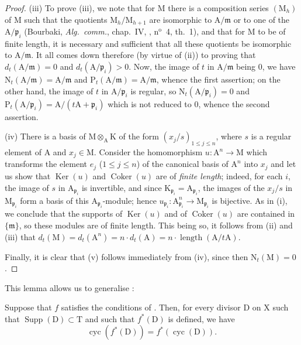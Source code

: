 \begin{proof}
(iii) To prove (iii), we note that for $\mathrm{M}$ there is a composition series $(\mathrm{M}_h)$ of $\mathrm{M}$ such that the quotients $\mathrm{M}_h/\mathrm{M}_{h+1}$ are isomorphic to $\mathrm{A}/\mathfrak{m}$ or to one of the $\mathrm{A}/\mathfrak{p}_i$ (Bourbaki, \emph{Alg.\ comm.}, chap.~IV, , n$^{\mathrm{o}}$~4, th.~1), and that for $\mathrm{M}$ to be of finite length, it is necessary and sufficient that all these quotients be isomorphic to $\mathrm{A}/\mathfrak{m}$.
It all comes down therefore (by virtue of (ii)) to proving that $d_t(\mathrm{A}/\mathfrak{m})=0$ and $d_t(\mathrm{A}/\mathfrak{p}_i)>0$.
Now, the image of $t$ in $\mathrm{A}/\mathfrak{m}$ being $0$, we have $\mathrm{N}_t(\mathrm{A}/\mathfrak{m})=\mathrm{A}/\mathfrak{m}$ and $\mathrm{P}_t(\mathrm{A}/\mathfrak{m})=\mathrm{A}/\mathfrak{m}$, whence the first assertion; on the other hand, the image of $t$ in $\mathrm{A}/\mathfrak{p}_i$ is regular, so $\mathrm{N}_t(\mathrm{A}/\mathfrak{p}_i)=0$ and $\mathrm{P}_t(\mathrm{A}/\mathfrak{p}_i)=\mathrm{A}/(t\mathrm{A}+\mathfrak{p}_i)$ which is not reduced to $0$, whence the second assertion.

(iv) There is a basis of $\mathrm{M}\otimes_{\mathrm{A}}\mathrm{K}$ of the form $(x_j/s)_{1\leq j\leq n}$, where $s$ is a regular element of $\mathrm{A}$ and $x_j\in\mathrm{M}$.
Consider the homomorphism $u:\mathrm{A}^n\to\mathrm{M}$ which transforms the element $e_j$ ($1\leq j\leq n$) of the canonical basis of $\mathrm{A}^n$ into $x_j$ and let us show that $\operatorname{Ker}(u)$ and $\operatorname{Coker}(u)$ are of \emph{finite length}; indeed, for each $i$, the image of $s$ in $\mathrm{A}_{\mathfrak{p}_i}$ is invertible, and since $\mathrm{K}_{\mathfrak{p}_i}=\mathrm{A}_{\mathfrak{p}_i}$, the images of the $x_j/s$ in $\mathrm{M}_{\mathfrak{p}_i}$ form a basis of this $\mathrm{A}_{\mathfrak{p}_i}$-module; hence $u_{\mathfrak{p}_i}:\mathrm{A}_{\mathfrak{p}_i}^n\to\mathrm{M}_{\mathfrak{p}_i}$ is bijective.
As in (i), we conclude that the supports of $\operatorname{Ker}(u)$ and of $\operatorname{Coker}(u)$ are contained in $\{\mathfrak{m}\}$, so these modules are of finite length.
This being so, it follows from (ii) and (iii) that $d_t(\mathrm{M})=d_t(\mathrm{A}^n)=n\cdot d_t(\mathrm{A})=n\cdot\operatorname{length}(\mathrm{A}/t\mathrm{A})$.

Finally, it is clear that (v) follows immediately from (iv), since then $\mathrm{N}_t(\mathrm{M})=0$.
\end{proof}

This lemma allows us to generalise :
\begin{proposition}[21.10.13]
\label{IV.21.10.13bis}
Suppose that $f$ satisfies the conditions of .
Then, for every divisor $\mathrm{D}$ on $\mathrm{X}$ such that $\operatorname{Supp}(\mathrm{D})\subset\mathrm{T}$ and such that $f^*(\mathrm{D})$ is defined, we have
\[
\label{IV.21.10.13.1}
  \operatorname{cyc}(f^*(\mathrm{D}))=f^*(\operatorname{cyc}(\mathrm{D})).
  \tag{21.10.13.1}
\]
\end{proposition}

